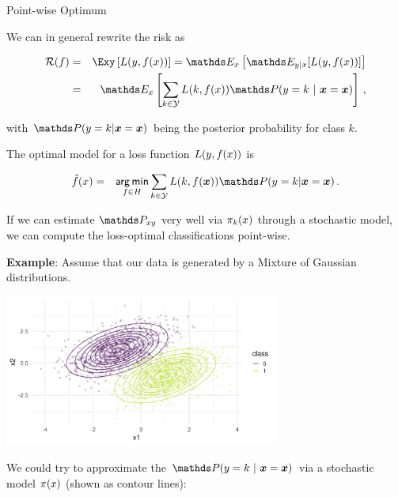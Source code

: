 \begin{vbframe}{Point-wise Optimum}


We can in general rewrite the risk as

\vspace*{-0.5cm}

\begin{eqnarray*}
  \riskf  & = & \Exy\left[\Lxy\right] = \E_x \left[ \E_{y|x} [ L(y, \fx) ] \right] \\
          & = & \E_x \left[\sum_{k \in \Yspace} L(k, \fx) \P(y = k~|~ \xv = \xv)\right]\,, \\
\end{eqnarray*}

with $\P(y = k| \xv = \xv)$ being the posterior probability for class $k$.

\lz 

The optimal model for a loss function $L(y, f(x))$ is

\begin{eqnarray*}
  \fxh &=& \argmin_{f \in \Hspace} \sum_{k \in \Yspace} L(k, f(\bm{x})) \P(y = k| \xv = \xv)\,.  \\
\end{eqnarray*}

If we can estimate $\Pxy$ very well via $\pi_k(x)$ through a stochastic model, we can compute the loss-optimal classifications point-wise. 

\lz

\textbf{Example}: Assume that our data is generated by a Mixture of Gaussian distributions. 

\begin{center}
\includegraphics[width = 9cm ]{figure_man/bayes_error_1.png} \\
\end{center}

\framebreak 

We could try to approximate the $\P(y = k ~|~ \xv = \xv)$ via a stochastic model $\pi(x)$ (shown as contour lines): 


\end{vbframe}
